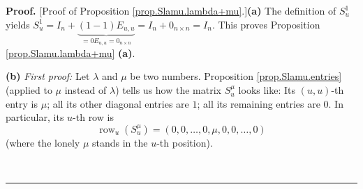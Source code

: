 \documentclass[numbers=enddot,12pt,final,onecolumn,notitlepage]{scrartcl}%
\theoremstyle{definition}
\newenvironment{proof}[1][Proof]{\noindent\textbf{#1.} }{\ \rule{0.5em}{0.5em}}
\begin{document}
\begin{proof}
[Proof of Proposition \ref{prop.Slamu.lambda+mu}.]\textbf{(a)} The definition
of $S_{u}^{1}$ yields $S_{u}^{1}=I_{n}+\underbrace{\left(  1-1\right)
E_{u,u}}_{=0E_{u,u}=0_{n\times n}}=I_{n}+0_{n\times n}=I_{n}$. This proves
Proposition \ref{prop.Slamu.lambda+mu} \textbf{(a)}.

\textbf{(b)} \textit{First proof:} Let $\lambda$ and $\mu$ be two numbers.
Proposition \ref{prop.Slamu.entries} (applied to $\mu$ instead of $\lambda$)
tells us how the matrix $S_{u}^{\mu}$ looks like: Its $\left(  u,u\right)
$-th entry is $\mu$; all its other diagonal entries are $1$; all its remaining
entries are $0$. In particular, its $u$-th row is%
\begin{equation}
\operatorname*{row}\nolimits_{u}\left(  S_{u}^{\mu}\right)  =\left(
0,0,\ldots,0,\mu,0,0,\ldots,0\right)  \label{pf.prop.Slamu.lambda+mu.b.1}%
\end{equation}
(where the lonely $\mu$ stands in the $u$-th position).


\end{proof}
\end{document}

